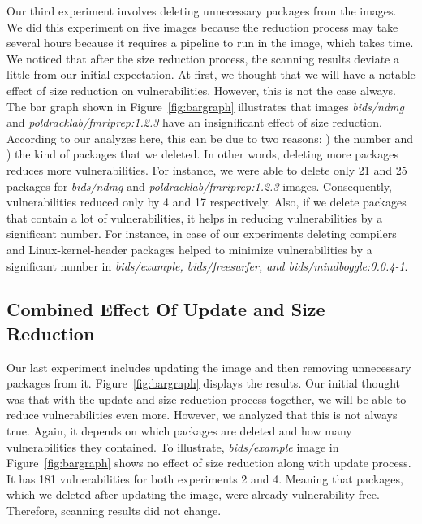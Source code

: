 \documentclass[a4paper,num-refs]{oup-contemporary}
\newcommand{\rom}[1]{\lowercase\expandafter{\romannumeral #1\relax}}
\begin{document}
Our third experiment involves deleting unnecessary packages from the images.
We did this experiment on five images because the reduction process may take
several hours because it requires 
a pipeline to run in the image, which takes time. We noticed that
after the size reduction process, the scanning results deviate a little from our initial expectation.
At first, we thought that we will have a notable effect of size reduction on
vulnerabilities. However, this is not the case always. The bar graph shown in
Figure~\ref{fig:bargraph} illustrates that images \textit{bids/ndmg} and
\textit{poldracklab/fmriprep:1.2.3} have an insignificant effect of size reduction.
According to our analyzes here, this can be due to two reasons: \rom{1}) the number
and \rom{2}) the kind of packages that we deleted. In other
words, deleting more packages reduces more vulnerabilities. 
For instance, we were able to delete only 21 and 25 packages for 
\textit{bids/ndmg} and \textit{poldracklab/fmriprep:1.2.3} images. Consequently, vulnerabilities
reduced only by 4 and 17 respectively. 
Also, if we delete packages that contain a lot of vulnerabilities, it helps in reducing
vulnerabilities by a significant number. For instance, in case of our experiments
deleting compilers and Linux-kernel-header packages helped to minimize vulnerabilities
by a significant number in \textit{bids/example, bids/freesurfer, and bids/mindboggle:0.0.4-1}. 

\subsection{Combined Effect Of Update and Size Reduction}

Our last experiment includes updating the image and then removing unnecessary packages from it.
Figure~\ref{fig:bargraph} displays the results. 
Our initial thought was that with the update and size reduction process together, we will be able to
reduce vulnerabilities even more. However,
we analyzed that this is not always true. Again, it depends on which packages are deleted and how
many vulnerabilities they contained. To illustrate, \textit{bids/example} image in Figure~\ref{fig:bargraph}
shows no effect of size reduction along with update process. It has 181 vulnerabilities for both experiments 2 and 4.
Meaning that packages, which we deleted after updating the image, were already vulnerability free. Therefore,
scanning results did not change.
\end{document}
